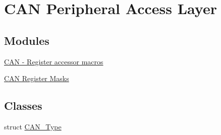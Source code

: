 \hypertarget{group__CAN__Peripheral__Access__Layer}{}\section{C\+AN Peripheral Access Layer}
\label{group__CAN__Peripheral__Access__Layer}
\subsection*{Modules}
\begin{DoxyCompactItemize}
\item 
\hyperlink{group__CAN__Register__Accessor__Macros}{C\+A\+N -\/ Register accessor macros}
\item 
\hyperlink{group__CAN__Register__Masks}{C\+A\+N Register Masks}
\end{DoxyCompactItemize}
\subsection*{Classes}
\begin{DoxyCompactItemize}
\item 
struct \hyperlink{structCAN__Type}{C\+A\+N\+\_\+\+Type}
\end{DoxyCompactItemize}
